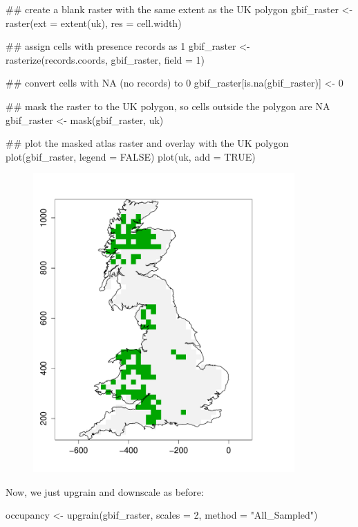 \documentclass{article}[12pt, a4paper]
\begin{document}
\begin{Schunk}
\begin{Sinput}
## create a blank raster with the same extent as the UK polygon
gbif_raster <- raster(ext = extent(uk),
                      res = cell.width)

## assign cells with presence records as 1
gbif_raster <- rasterize(records.coords, gbif_raster, field = 1)

## convert cells with NA (no records) to 0
gbif_raster[is.na(gbif_raster)] <- 0

## mask the raster to the UK polygon, so cells outside the polygon are NA
gbif_raster <- mask(gbif_raster, uk)

## plot the masked atlas raster and overlay with the UK polygon
plot(gbif_raster, legend = FALSE)
plot(uk, add = TRUE)
\end{Sinput}
\end{Schunk}

\begin{figure}[!ht]
\centering
\includegraphics[width=10cm]{Downscaling-downscale40}
\end{figure}

\newpage
Now, we just upgrain and downscale as before:

\begin{Schunk}
\begin{Sinput}
occupancy <- upgrain(gbif_raster,
                     scales = 2,
                     method = "All_Sampled")
\end{Sinput}
\end{Schunk}
\end{document}
